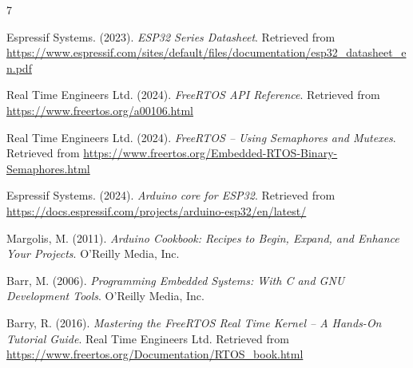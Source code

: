 \begin{thebibliography}{7}

    Espressif Systems. (2023). \textit{ESP32 Series Datasheet}.
    Retrieved from \url{https://www.espressif.com/sites/default/files/documentation/esp32_datasheet_en.pdf}

    Real Time Engineers Ltd. (2024). \textit{FreeRTOS API Reference}.
    Retrieved from \url{https://www.freertos.org/a00106.html}

    Real Time Engineers Ltd. (2024). \textit{FreeRTOS -- Using Semaphores and Mutexes}.
    Retrieved from \url{https://www.freertos.org/Embedded-RTOS-Binary-Semaphores.html}

    Espressif Systems. (2024). \textit{Arduino core for ESP32}.
    Retrieved from \url{https://docs.espressif.com/projects/arduino-esp32/en/latest/}

    Margolis, M. (2011). \textit{Arduino Cookbook: Recipes to Begin, Expand, and Enhance Your Projects}.
    O'Reilly Media, Inc.

    Barr, M. (2006). \textit{Programming Embedded Systems: With C and GNU Development Tools}.
    O'Reilly Media, Inc.

    Barry, R. (2016). \textit{Mastering the FreeRTOS Real Time Kernel -- A Hands-On Tutorial Guide}.
    Real Time Engineers Ltd.
    Retrieved from \url{https://www.freertos.org/Documentation/RTOS_book.html}

\end{thebibliography}
